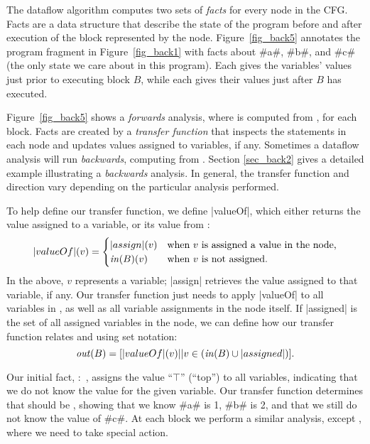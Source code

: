 \documentclass[12pt]{report}
\begin{document}
The dataflow algorithm computes two sets of \emph{facts} for every
node in the CFG. Facts are a data structure that describe the state of
the program before and after execution of the block represented by the
node. Figure~\ref{fig_back5} annotates the program fragment in
Figure~\ref{fig_back1} with facts about #a#, #b#, and #c# (the only
state we care about in this program). Each \inBa gives the variables'
values just prior to executing block $B$, while each \outBa gives
their values just after $B$ has executed.  

Figure~\ref{fig_back5} shows a \emph{forwards} analysis, where \outBa
is computed from \inBa, for each block. Facts are created by a
\emph{transfer function} that inspects the statements in each node and
updates values assigned to variables, if any. Sometimes a dataflow
analysis will run \emph{backwards}, computing \inBa from
\outBa. Section \ref{sec_back2} gives a detailed example illustrating
a \emph{backwards} analysis. In general, the transfer function and
direction vary depending on the particular analysis performed.

To help define our transfer function, we define |valueOf|,
which either returns the value assigned to a variable, or its value
from \inBa:
\begin{equation} |valueOf|(v) = 
  \begin{cases}
    |assign|(v) & \text{when $v$ is assigned a value in the node,} \\
    \text{\ensuremath{\mathit{in}(B)}}(v) & \text{when $v$ is not assigned.} 
  \end{cases}
\label{eqn_back2}
\end{equation}
In the above, $v$ represents a variable; |assign| retrieves the value
assigned to that variable, if any.  Our transfer function just needs
to apply |valueOf| to all variables in \inBa, as well as all
variable assignments in the node itself. If |assigned| is the set of
all assigned variables in the node, we can define how our transfer
function relates \inBa and \outBa using set notation:
\begin{equation}
  \text{\ensuremath{\mathit{out}(B)}} = [|valueOf|(v) || v \in (\text{\ensuremath{\mathit{in}(B)}} \cup |assigned|)].
\end{equation}

Our initial fact, :~, assigns the value ``$\top$'' (``top'') to all variables,
indicating that we do not know the value for the given variable. Our
transfer function determines that  should be
, showing that we know #a# is 1, #b# is 2, and
that we still do not know the value of #c#. At each block we perform a
similar analysis, except , where we need to
  take special action.
\end{document}
